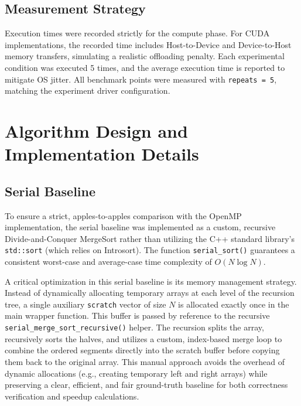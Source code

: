 \documentclass[12pt, a4paper]{article}
\begin{document}
\subsection{Measurement Strategy}
Execution times were recorded strictly for the compute phase. For CUDA implementations, the recorded time includes Host-to-Device and Device-to-Host memory transfers, simulating a realistic offloading penalty. Each experimental condition was executed 5 times, and the average execution time is reported to mitigate OS jitter. All benchmark points were measured with \texttt{repeats = 5}, matching the experiment driver configuration.

\section{Algorithm Design and Implementation Details}

\subsection{Serial Baseline}
To ensure a strict, apples-to-apples comparison with the OpenMP implementation, the serial baseline was implemented as a custom, recursive Divide-and-Conquer MergeSort rather than utilizing the C++ standard library's \texttt{std::sort} (which relies on Introsort). The function \texttt{serial\_sort()} guarantees a consistent worst-case and average-case time complexity of $O(N \log N)$.

A critical optimization in this serial baseline is its memory management strategy. Instead of dynamically allocating temporary arrays at each level of the recursion tree, a single auxiliary \texttt{scratch} vector of size $N$ is allocated exactly once in the main wrapper function. This buffer is passed by reference to the recursive \texttt{serial\_merge\_sort\_recursive()} helper. The recursion splits the array, recursively sorts the halves, and utilizes a custom, index-based merge loop to combine the ordered segments directly into the scratch buffer before copying them back to the original array. This manual approach avoids the overhead of dynamic allocations (e.g., creating temporary left and right arrays) while preserving a clear, efficient, and fair ground-truth baseline for both correctness verification and speedup calculations.
\end{document}
